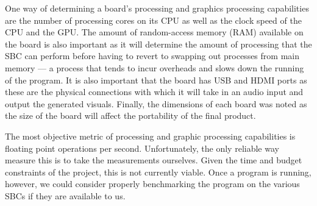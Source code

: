 \documentclass[../main_report1.tex]{subfiles}
\begin{document}
One way of determining a board's processing and graphics processing capabilities are the number of processing cores on its CPU as well as the clock speed of the CPU and the GPU. The amount of random-access memory (RAM) available on the board is also important as it will determine the amount of processing that the SBC can perform before having to revert to swapping out processes from main memory --- a process that tends to incur overheads and slows down the running of the program. It is also important that the board has USB and HDMI ports as these are the physical connections with which it will take in an audio input and output the generated visuals. Finally, the dimensions of each board was noted as the size of the board will affect the portability of the final product. \par

The most objective metric of processing and graphic processing capabilities is floating point operations per second. Unfortunately, the only reliable way measure this is to take the measurements ourselves. Given the time and budget constraints of the project, this is not currently viable. Once a program is running, however, we could consider properly benchmarking the program on the various SBCs if they are available to us.
\end{document}
